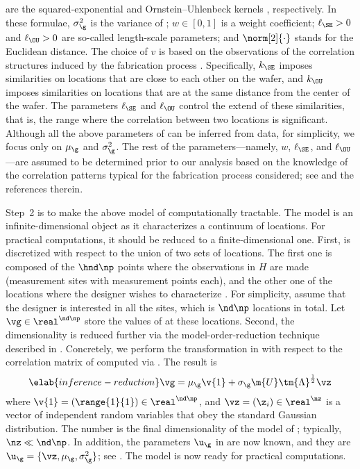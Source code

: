 are the squared-exponential and Ornstein--Uhlenbeck kernels
\cite{rasmussen2006}, respectively. In these formulae, $\sigma_\g^2$ is the
variance of \g; $w \in [0, 1]$ is a weight coefficient; $\ell_\SE > 0$ and
$\ell_\OU > 0$ are so-called length-scale parameters; and $\norm[2]{\cdot}$
stands for the Euclidean distance. The choice of $v$ is based on the
observations of the correlation structures induced by the fabrication process
\cite{chandrakasan2000, cheng2011}. Specifically, $k_\SE$ imposes similarities
on locations that are close to each other on the wafer, and $k_\OU$ imposes
similarities on locations that are at the same distance from the center of the
wafer. The parameters $\ell_\SE$ and $\ell_\OU$ control the extend of these
similarities, that is, the range where the correlation between two locations is
significant. Although all the above parameters of \g can be inferred from data,
for simplicity, we focus only on $\mu_\g$ and $\sigma_\g^2$. The rest of the
parameters---namely, $w$, $\ell_\SE$, and $\ell_\OU$---are assumed to be
determined prior to our analysis based on the knowledge of the correlation
patterns typical for the fabrication process considered; see \cite{marzouk2009}
and the references therein.

Step~2 is to make the above model of \g computationally tractable. The model is
an infinite-dimensional object as it characterizes a continuum of locations. For
practical computations, it should be reduced to a finite-dimensional one. First,
\g is discretized with respect to the union of two sets of locations. The first
one is composed of the $\hnd \np$ points where the observations in $H$ are made
(\hnd measurement sites with \np measurement points each), and the other one of
the locations where the designer wishes to characterize \g. For simplicity,
assume that the designer is interested in all the sites, which is $\nd \np$
locations in total. Let $\vg \in \real^{\nd \np}$ store the values of \g at
these locations. Second, the dimensionality is reduced further via the
model-order-reduction technique described in .
Concretely, we perform the transformation in  with
respect to the correlation matrix of \vg computed via
. The result is
\begin{equation} \elab{inference-reduction}
  \vg = \mu_\g \v{1} + \sigma_\g \m{U} \tm{\Lambda}^\frac{1}{2} \vz
\end{equation}
where $\v{1} = (\range{1}{1}) \in \real^{\nd \np}$, and $\vz = (\z_i) \in
\real^\nz$ is a vector of independent random variables that obey the standard
Gaussian distribution. The number \nz is the final dimensionality of the model
of \g; typically, $\nz \ll \nd \np$. In addition, the parameters $\u_\g$ in
 are now known, and they are $\u_\g = \{ \vz,
\mu_\g, \sigma^2_\g \}$; see . The model is
now ready for practical computations.

